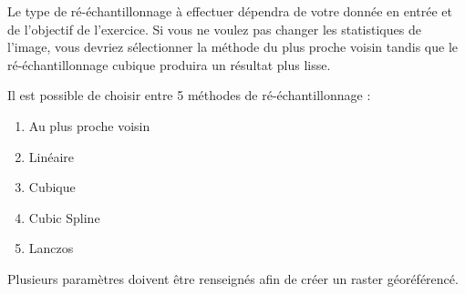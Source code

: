 Le type de ré-échantillonnage à effectuer dépendra de votre donnée en entrée et de l'objectif de l'exercice. Si vous ne voulez pas changer les statistiques de l'image, vous devriez sélectionner la méthode du plus proche voisin tandis que le ré-échantillonnage cubique produira un résultat plus lisse.

Il est possible de choisir entre 5 méthodes de ré-échantillonnage :

\begin{enumerate}
\item Au plus proche voisin
\item Linéaire
\item Cubique
\item Cubic Spline
\item Lanczos
\end{enumerate}


Plusieurs paramètres doivent être renseignés afin de créer un raster géoréférencé.

